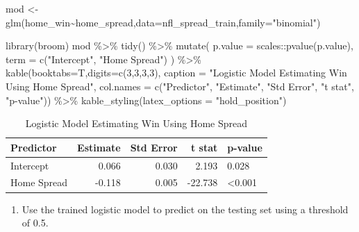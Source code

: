 \documentclass[
  11pt,
]{book}
\newenvironment{Shaded}{\begin{snugshade}}{\end{snugshade}}
\newcommand{\AttributeTok}[1]{\textcolor[rgb]{0.77,0.63,0.00}{#1}}
\newcommand{\DecValTok}[1]{\textcolor[rgb]{0.00,0.00,0.81}{#1}}
\newcommand{\FunctionTok}[1]{\textcolor[rgb]{0.00,0.00,0.00}{#1}}
\newcommand{\NormalTok}[1]{#1}
\newcommand{\OtherTok}[1]{\textcolor[rgb]{0.56,0.35,0.01}{#1}}
\newcommand{\SpecialCharTok}[1]{\textcolor[rgb]{0.00,0.00,0.00}{#1}}
\newcommand{\StringTok}[1]{\textcolor[rgb]{0.31,0.60,0.02}{#1}}
\providecommand{\tightlist}{%
  \setlength{\itemsep}{0pt}\setlength{\parskip}{0pt}}
\theoremstyle{definition}
\theoremstyle{definition}
\theoremstyle{definition}
\theoremstyle{definition}
\theoremstyle{remark}
\begin{document}
\begin{Shaded}
\begin{Highlighting}[]
\NormalTok{mod }\OtherTok{\textless{}{-}} \FunctionTok{glm}\NormalTok{(home\_win}\SpecialCharTok{\textasciitilde{}}\NormalTok{home\_spread,}\AttributeTok{data=}\NormalTok{nfl\_spread\_train,}\AttributeTok{family=}\StringTok{"binomial"}\NormalTok{)}

\FunctionTok{library}\NormalTok{(broom)}
\NormalTok{mod }\SpecialCharTok{\%\textgreater{}\%} \FunctionTok{tidy}\NormalTok{() }\SpecialCharTok{\%\textgreater{}\%}
  \FunctionTok{mutate}\NormalTok{(}
    \AttributeTok{p.value =}\NormalTok{ scales}\SpecialCharTok{::}\FunctionTok{pvalue}\NormalTok{(p.value),}
    \AttributeTok{term =} \FunctionTok{c}\NormalTok{(}\StringTok{"Intercept"}\NormalTok{, }\StringTok{"Home Spread"}\NormalTok{)}
\NormalTok{  ) }\SpecialCharTok{\%\textgreater{}\%}
  \FunctionTok{kable}\NormalTok{(}\AttributeTok{booktabs=}\NormalTok{T,}\AttributeTok{digits=}\FunctionTok{c}\NormalTok{(}\DecValTok{3}\NormalTok{,}\DecValTok{3}\NormalTok{,}\DecValTok{3}\NormalTok{,}\DecValTok{3}\NormalTok{), }
        \AttributeTok{caption =} \StringTok{"Logistic Model Estimating Win Using Home Spread"}\NormalTok{,}
        \AttributeTok{col.names =} \FunctionTok{c}\NormalTok{(}\StringTok{"Predictor"}\NormalTok{, }\StringTok{"Estimate"}\NormalTok{, }\StringTok{"Std Error"}\NormalTok{, }\StringTok{"t stat"}\NormalTok{, }\StringTok{"p{-}value"}\NormalTok{)) }\SpecialCharTok{\%\textgreater{}\%}
  \FunctionTok{kable\_styling}\NormalTok{(}\AttributeTok{latex\_options =} \StringTok{"hold\_position"}\NormalTok{)}
\end{Highlighting}
\end{Shaded}

\begin{table}[!h]

\caption{\label{tab:unnamed-chunk-317}Logistic Model Estimating Win Using Home Spread}
\centering
\begin{tabular}[t]{lrrrl}
\toprule
Predictor & Estimate & Std Error & t stat & p-value\\
\midrule
Intercept & 0.066 & 0.030 & 2.193 & 0.028\\
Home Spread & -0.118 & 0.005 & -22.738 & <0.001\\
\bottomrule
\end{tabular}
\end{table}

\begin{enumerate}
\def\labelenumi{(\alph{enumi})}
\setcounter{enumi}{3}
\tightlist
\item
  Use the trained logistic model to predict on the testing set using a threshold of 0.5.
\end{enumerate}
\end{document}
